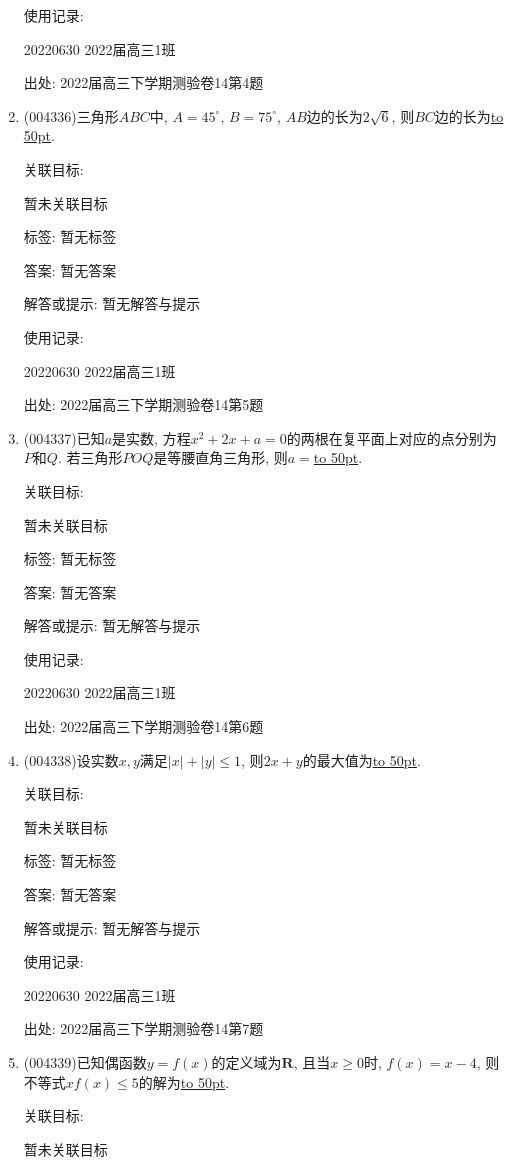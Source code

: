\documentclass[10pt,a4paper]{article}
\newcommand{\blank}[1]{\underline{\hbox to #1pt{}}}
\begin{document}
\begin{enumerate}[1.]
使用记录:

20220630	2022届高三1班	


出处: 2022届高三下学期测验卷14第4题
\item { (004336)}三角形$ABC$中, $A=45^\circ$, $B=75^\circ$, $AB$边的长为$2\sqrt 6$, 则$BC$边的长为\blank{50}.


关联目标:

暂未关联目标



标签: 暂无标签

答案: 暂无答案

解答或提示: 暂无解答与提示

使用记录:

20220630	2022届高三1班	


出处: 2022届高三下学期测验卷14第5题
\item { (004337)}已知$a$是实数, 方程$x^2+2x+a=0$的两根在复平面上对应的点分别为$P$和$Q$. 若三角形$POQ$是等腰直角三角形, 则$a=$\blank{50}.


关联目标:

暂未关联目标



标签: 暂无标签

答案: 暂无答案

解答或提示: 暂无解答与提示

使用记录:

20220630	2022届高三1班	


出处: 2022届高三下学期测验卷14第6题
\item { (004338)}设实数$x,y$满足$|x|+|y|\le 1$, 则$2x+y$的最大值为\blank{50}.


关联目标:

暂未关联目标



标签: 暂无标签

答案: 暂无答案

解答或提示: 暂无解答与提示

使用记录:

20220630	2022届高三1班	


出处: 2022届高三下学期测验卷14第7题
\item { (004339)}已知偶函数$y=f(x)$的定义域为$\mathbf{R}$, 且当$x\ge 0$时, $f(x)=x-4$, 则不等式$xf(x)\le 5$的解为\blank{50}.


关联目标:

暂未关联目标




\end{enumerate}
\end{document}
